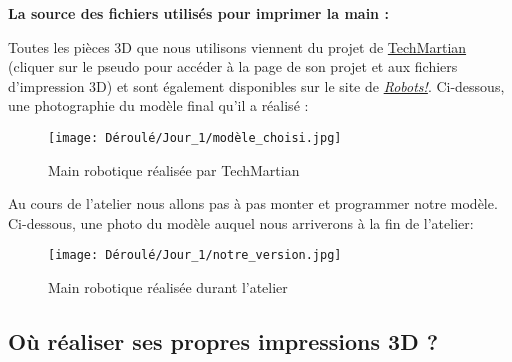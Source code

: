 \newpage

\begin{flushleft}
    \textbf{La source des fichiers utilisés pour imprimer la main :}
    
    Toutes les pièces 3D que nous utilisons viennent du projet de \href{https://www.instructables.com/3D-Printed-Robotic-Hand/}{TechMartian} (cliquer sur le pseudo pour accéder à la page de son projet et aux fichiers d'impression 3D) et sont également disponibles sur le site de \href{https://www.association-robots.com/}{\textit{Robots!}}. Ci-dessous, une photographie du modèle final qu'il a réalisé :\\
    
    \begin{figure}[!h]
        \centering
        \texttt{[image: Déroulé/Jour\_1/modèle\_choisi.jpg]}
        \caption[Projet de TechMartian]{Main robotique réalisée par TechMartian}
        \label{fig:my_label}
    \end{figure}
\end{flushleft}

\begin{flushleft}
     Au cours de l'atelier nous allons pas à pas monter et programmer notre modèle.
     Ci-dessous, une photo du modèle auquel nous arriverons à la fin de l'atelier:\\
    
    \begin{figure}[!h]
        \centering
        \texttt{[image: Déroulé/Jour\_1/notre\_version.jpg]}
        \caption[Notre main]{Main robotique réalisée durant l'atelier}
        \label{fig:my_label}
    \end{figure}
\end{flushleft}

\newpage

\subsection{Où réaliser ses propres impressions 3D ?}

